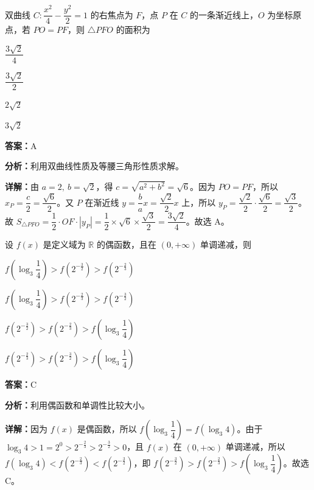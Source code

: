 \begin{question}[points=5]
双曲线 $C: \dfrac{x^2}{4} - \dfrac{y^2}{2} = 1$ 的右焦点为 $F$，点 $P$ 在 $C$ 的一条渐近线上，$O$ 为坐标原点，若 $PO = PF$，则 $\triangle PFO$ 的面积为
\begin{choices}
  \item $\dfrac{3\sqrt{2}}{4}$
  \item $\dfrac{3\sqrt{2}}{2}$
  \item $2\sqrt{2}$
  \item $3\sqrt{2}$
\end{choices}
\begin{solution}
\textbf{答案：}A

\textbf{分析：}利用双曲线性质及等腰三角形性质求解。

\textbf{详解：}由 $a=2,\ b=\sqrt{2}$，得 $c=\sqrt{a^2+b^2}=\sqrt{6}$。因为 $PO=PF$，所以 $x_P = \dfrac{c}{2} = \dfrac{\sqrt{6}}{2}$。又 $P$ 在渐近线 $y=\dfrac{b}{a}x = \dfrac{\sqrt{2}}{2}x$ 上，所以 $y_P = \dfrac{\sqrt{2}}{2} \cdot \dfrac{\sqrt{6}}{2} = \dfrac{\sqrt{3}}{2}$。故 $S_{\triangle PFO} = \dfrac{1}{2} \cdot OF \cdot |y_P| = \dfrac{1}{2} \times \sqrt{6} \times \dfrac{\sqrt{3}}{2} = \dfrac{3\sqrt{2}}{4}$。故选 A。
\end{solution}
\end{question}

\begin{question}[points=5]
设 $f(x)$ 是定义域为 $\mathbb{R}$ 的偶函数，且在 $(0,+\infty)$ 单调递减，则
\begin{choices}
  \item $f\left(\log_3\dfrac{1}{4}\right) > f\left(2^{-\frac{3}{2}}\right) > f\left(2^{-\frac{2}{3}}\right)$
  \item $f\left(\log_3\dfrac{1}{4}\right) > f\left(2^{-\frac{2}{3}}\right) > f\left(2^{-\frac{3}{2}}\right)$
  \item $f\left(2^{-\frac{3}{2}}\right) > f\left(2^{-\frac{2}{3}}\right) > f\left(\log_3\dfrac{1}{4}\right)$
  \item $f\left(2^{-\frac{2}{3}}\right) > f\left(2^{-\frac{3}{2}}\right) > f\left(\log_3\dfrac{1}{4}\right)$
\end{choices}
\begin{solution}
\textbf{答案：}C

\textbf{分析：}利用偶函数和单调性比较大小。

\textbf{详解：}因为 $f(x)$ 是偶函数，所以 $f\left(\log_3\dfrac{1}{4}\right) = f(\log_3 4)$。由于 $\log_3 4 > 1 = 2^0 > 2^{-\frac{2}{3}} > 2^{-\frac{3}{2}} > 0$，且 $f(x)$ 在 $(0,+\infty)$ 单调递减，所以 $f(\log_3 4) < f\left(2^{-\frac{2}{3}}\right) < f\left(2^{-\frac{3}{2}}\right)$，即 $f\left(2^{-\frac{3}{2}}\right) > f\left(2^{-\frac{2}{3}}\right) > f\left(\log_3\dfrac{1}{4}\right)$。故选 C。
\end{solution}
\end{question}

